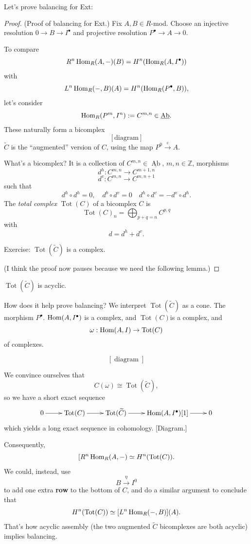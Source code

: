 Let's prove balancing for Ext:

\begin{proof}
(Proof of balancing for Ext.)
Fix $A,B \in R$-mod. Choose an
injective resolution
$0 \to B \to I^\bullet$
and projective resolution
$P^\bullet \to A \to 0$.

To compare 
$$
R^n\mathop{\mathrm{Hom}}\nolimits_R(A,-)(B)
=
H^n(\mathop{\mathrm{Hom}}\nolimits_R(A,I^\bullet))
$$
with
$$
L^n\mathop{\mathrm{Hom}}\nolimits_R(-,B)(A)
=
H^n(\mathop{\mathrm{Hom}}\nolimits_R(P^\bullet,B)),
$$
let's consider
$$
\mathop{\mathrm{Hom}}\nolimits_R(P^m,I^n)
:=
C^{m,n} \in \underline{\operatorname{Ab}}.
$$
These naturally form a bicomplex
$$
\operatorname{[diagram]}
$$
$\widetilde{C}$ is the ``augmented'' version
of $C$, using the map $P^0
\xrightarrow{\varepsilon} A$.

What's a bicomplex? It is a collection of
$C^{m,n} \in \underline{\operatorname{Ab}}$,
$m,n \in \mathbb{Z}$, morphisms 
$$
d^h:C^{m,n}\to C^{m+1,n}
$$
$$
d^v:C^{m,n} \to C^{m,n+1}
$$
such that
$$
d^h \circ d^h =0,
\quad 
d^b \circ d^v =0
\quad 
d^h \circ d^v = -d^v \circ d^h.
$$
The {\it total
complex} $\operatorname{Tot}(C)$ of a bicomplex $C$
is
$$
\operatorname{Tot}(C)_n
=
\bigoplus_{p+q=n}C^{p,q}
$$
with
$$
d=d^h + d^v.
$$

\noindent
Exercise:
$\operatorname{Tot}(\widetilde{C})$
is a complex.

(I think the proof now pauses because we
need the following lemma.)
\end{proof}

\begin{lemma}
\label{lemma-assembly}
$\operatorname{Tot}(\widetilde{C})$
is acyclic.
\end{lemma}

\noindent
How does it help prove balancing?
We interpret $\operatorname{Tot}(\tilde{C})$
as a cone. The morphism
$P^\bullet.$
$\mathop{\mathrm{Hom}}\nolimits(A,I^\bullet)$ is a complex,
and $\operatorname{Tot}(C)$is a complex,
and
$$
\omega:\mathop{\mathrm{Hom}}\nolimits(A,I)
\to \operatorname{Tot}(C)
$$
of complexes.

$$
[\operatorname{diagram}]
$$

We convince ourselves that
$$
C(\omega)
\cong
\operatorname{Tot}(\widetilde{C}),
$$
so we have a short exact sequence
$$
\xymatrix{
0\ar[r]
&\operatorname{Tot}(C)\ar[r]
&\operatorname{Tot}(\widetilde{C})\ar[r]
&\Hom(A,I^\bullet)[1]\ar[r]
&0
}
$$
which yields a long exact sequence in
cohomology. [Diagram.]

Consequently,
$$
[R^n\mathop{\mathrm{Hom}}\nolimits_R(A,-)
\simeq
H^n(\operatorname{Tot}(C)).
$$
We could, instead, use
$$
B \xrightarrow{\eta} I^0
$$
to add one extra {\bf row} 
to the bottom of $C$,
and do a similar argument to conclude that
$$
H^n(\operatorname{Tot}(C))
\simeq
[L^n\mathop{\mathrm{Hom}}\nolimits_R(-,B)](A).
$$
That's how acyclic assembly
(the two augmented $\widetilde{C}$
bicomplexes are both
acyclic) implies balancing.

